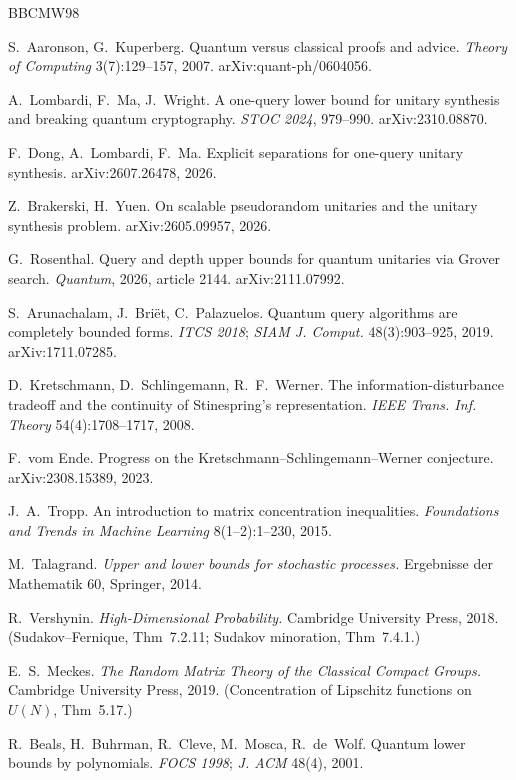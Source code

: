 \documentclass[11pt,a4paper]{article}
\theoremstyle{plain}
\theoremstyle{definition}
\theoremstyle{remark}
\begin{document}
\begin{thebibliography}{BBCMW98}

 S.~Aaronson, G.~Kuperberg. Quantum versus classical proofs and advice.
\emph{Theory of Computing} 3(7):129--157, 2007. arXiv:quant-ph/0604056.

 A.~Lombardi, F.~Ma, J.~Wright. A one-query lower bound for unitary
synthesis and breaking quantum cryptography. \emph{STOC 2024}, 979--990. arXiv:2310.08870.

 F.~Dong, A.~Lombardi, F.~Ma. Explicit separations for one-query unitary
synthesis. arXiv:2607.26478, 2026.

 Z.~Brakerski, H.~Yuen. On scalable pseudorandom unitaries and the unitary
synthesis problem. arXiv:2605.09957, 2026.

 G.~Rosenthal. Query and depth upper bounds for quantum unitaries via
Grover search. \emph{Quantum}, 2026, article 2144. arXiv:2111.07992.

 S.~Arunachalam, J.~Bri\"et, C.~Palazuelos. Quantum query algorithms are
completely bounded forms. \emph{ITCS 2018}; \emph{SIAM J. Comput.} 48(3):903--925, 2019.
arXiv:1711.07285.

 D.~Kretschmann, D.~Schlingemann, R.~F.~Werner. The
information-disturbance tradeoff and the continuity of Stinespring's representation.
\emph{IEEE Trans. Inf. Theory} 54(4):1708--1717, 2008.

 F.~vom Ende. Progress on the Kretschmann--Schlingemann--Werner
conjecture. arXiv:2308.15389, 2023.

 J.~A.~Tropp. An introduction to matrix concentration inequalities.
\emph{Foundations and Trends in Machine Learning} 8(1--2):1--230, 2015.

 M.~Talagrand. \emph{Upper and lower bounds for stochastic processes.}
Ergebnisse der Mathematik 60, Springer, 2014.

 R.~Vershynin. \emph{High-Dimensional Probability.} Cambridge University
Press, 2018. (Sudakov--Fernique, Thm~7.2.11; Sudakov minoration, Thm~7.4.1.)

 E.~S.~Meckes. \emph{The Random Matrix Theory of the Classical Compact
Groups.} Cambridge University Press, 2019. (Concentration of Lipschitz functions on $U(N)$,
Thm~5.17.)

 R.~Beals, H.~Buhrman, R.~Cleve, M.~Mosca, R.~de~Wolf. Quantum lower
bounds by polynomials. \emph{FOCS 1998}; \emph{J. ACM} 48(4), 2001.


\end{thebibliography}
\end{document}
